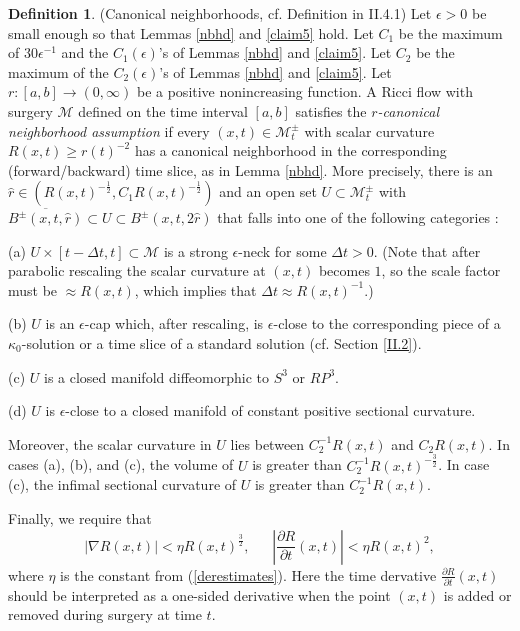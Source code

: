 \documentclass[12pt]{amsart}
\newcommand{\D}{\partial}
\newcommand{\De}{\Delta}
\newcommand{\M}{{\mathcal M}}
\newcommand{\eps}{\epsilon}
\newcommand{\ol}{\overline}
\newcommand{\ra}{\rightarrow}
\numberwithin{equation}{section}
\theoremstyle{plain}
\theoremstyle{definition}
\newtheorem{definition}[equation]{Definition}
\theoremstyle{remark}
\begin{document}
\begin{definition}(Canonical neighborhoods, cf. Definition in II.4.1)
\label{canonicalnbhddef}
Let $\eps>0$ be 
small enough so that Lemmas \ref{nbhd} and \ref{claim5} hold.
Let $C_1$ be the maximum of $30 \epsilon^{-1}$ and the $C_1(\eps)$'s of Lemmas
\ref{nbhd} and \ref{claim5}. Let $C_2$ be the maximum of the
$C_2(\epsilon)$'s of Lemmas
\ref{nbhd} and \ref{claim5}.
Let  $r:[a,b]\ra (0,\infty)$ be a positive nonincreasing function.
A Ricci flow with surgery $\M$ defined on the time interval $[a,b]$ satisfies
the {\em $r$-canonical neighborhood assumption} if every
$(x,t)\in \M_t^\pm$ with scalar curvature $R(x,t)\geq r(t)^{-2}$
has a canonical neighborhood in the corresponding (forward/backward)
time slice, as in Lemma \ref{nbhd}.  More precisely, there is
an  $\hat r\in (R(x,t)^{-\frac12},C_1R(x,t)^{-\frac12})$ 
and an open 
set $U\subset \M_t^\pm$ with 
$\ol{B^\pm(x,t,\hat r)}\subset U\subset B^\pm(x,t,2\hat r)$ that
falls into one of the
following categories : 

(a) $U\times [t-\De t,t]\subset\M$  is a strong $\eps$-neck
for some $\De t>0$.  (Note that after parabolic rescaling the scalar
curvature at $(x,t)$ becomes $1$, so the scale factor must be
$\approx R(x,t)$, which implies that $\De t\approx R(x,t)^{-1}$.)

(b) $U$ is an $\eps$-cap which, after rescaling, is $\epsilon$-close to the
corresponding piece of a $\kappa_0$-solution or a time slice of a standard
solution (cf. Section \ref{II.2}).

(c) $U$ is a closed manifold diffeomorphic to $S^3$ or $RP^3$.


(d) $U$ is  $\epsilon$-close to 
a closed manifold of constant positive sectional 
curvature.

\noindent
Moreover, the scalar curvature in $U$ lies between $C_2^{-1}R(x,t)$
and $C_2R(x,t)$.
In cases (a), (b), and  (c), the volume of $U$ is greater than 
$C_2^{-1}R(x,t)^{-\frac32}$. In case (c), the infimal
sectional curvature of $U$ is greater than $C_2^{-1}R(x,t)$.

Finally, we require that
\begin{equation}
\label{II.(1.3)estimates}
|\nabla R(x, t)|<\eta R(x, t)^{\frac32}, \: \: \:  \: \: \: \: 
\left|\frac{\D R}{\D t} (x, t)\right|<\eta R(x, t)^2,
\end{equation}
where $\eta$ is the constant from (\ref{derestimates}).  Here the time 
dervative $\frac{\D R}{\D t} (x, t)$ should be interpreted
as a one-sided derivative when the point $(x,t)$ is added or removed
during surgery at time $t$.
\end{definition}
\end{document}
